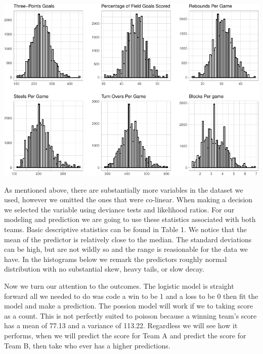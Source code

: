 \documentclass[
  man,floatsintext]{apa6}
\begin{document}
\includegraphics{paper_files/figure-latex/unnamed-chunk-2-1.pdf}

As mentioned above, there are substantially more variables in the dataset we used, however we omitted the ones that were co-linear. When making a decision we selected the variable using deviance tests and likelihood ratios. For our modeling and prediction we are going to use these statistics associated with both teams. Basic descriptive statistics can be found in Table 1. We notice that the mean of the predictor is relatively close to the median. The standard deviations can be high, but are not wildly so and the range is reasionable for the data we have. In the histograms below we remark the predictors roughly normal distribution with no substantial skew, heavy tails, or slow decay.

Now we turn our attention to the outcomes. The logistic model is straight forward all we needed to do was code a win to be 1 and a loss to be 0 then fit the model and make a prediction. The possion model will work if we to taking score as a count. This is not perfectly suited to poisson because a winning team's score has a mean of 77.13 and a variance of 113.22. Regardless we will see how it performs, when we will predict the score for Team A and predict the score for Team B, then take who ever has a higher predictions.
\end{document}
